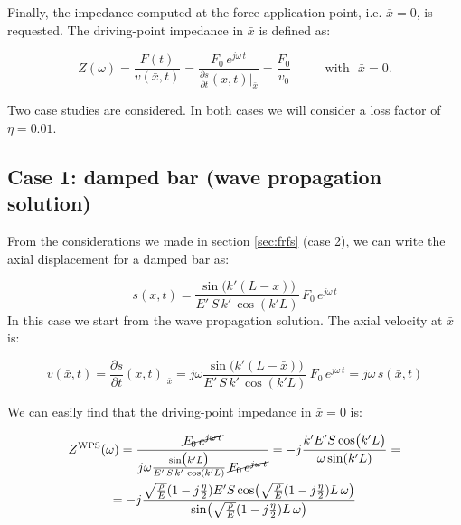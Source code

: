 \documentclass[a4paper,12pt,oneside]{article}
\begin{document}
\vspace{10pt}

Finally, the impedance computed at the force application point, i.e. $ \bar{x} = 0 $, is requested. The driving-point impedance in $\bar{x}$ is defined as:

\[
	Z(\omega) =
		\frac{F(t)}{v(\bar{x},t)} =
		\frac{F_0 \, e^{j \omega \, t}}
		{\frac{\partial s}{\partial t} (x,t)\big|_{\bar{x}}} = \frac{F_0}{v_0}
		\qquad \text{~ with ~} \bar{x} = 0.
\]

Two case studies are considered. In both cases we will consider a loss factor of $ \eta = 0.01 $.

\vspace{20pt}

\subsection*{Case 1: damped bar (wave propagation solution)}

\vspace{10pt}

From the considerations we made in section \ref{sec:frfs} (case 2), we can write the axial displacement for a damped bar as:

\[
	s(x,t) = \frac{\sin\bigl(k'(L - x)\bigr)}{E' \, S \, k' \, \cos(k'L)} \,
		F_0 \, e^{j \omega \, t}
\]
In this case we start from the wave propagation solution. The axial velocity at $ \bar{x} $ is:

\[
	v(\bar{x},t) = \frac{\partial s}{\partial t}(x,t)\big|_{\bar{x}} =
		j \omega \frac{\sin\bigl(k'(L - \bar{x})\bigr)}{E' \, S \, k' \, \cos(k'L)} \,
		F_0 \, e^{j \omega \, t} = j \omega \, s(\bar{x},t)
\]

\clearpage

We can easily find that the driving-point impedance in $ \bar{x} = 0 $ is:


\begin{gather*}
	Z^\textup{WPS} (\omega ) =	\frac{\cancel{F_0 \, e^{j \omega \, t}}}
		{j \omega \frac{\sin\bigl(k'L\bigr)}{E' \, S \, k' \, \cos(k'L)} \,
			\cancel{F_0 \, e^{j \omega \, t}}} =
			-j \frac{k' E' S \cos\bigl(k'L\bigr)}{\omega \sin(k'L)} = \\
	= -j \frac{\sqrt{\frac{\rho}{E}} (1 - j \frac{\eta}{2}) E' S
		\cos\bigl(\sqrt{\frac{\rho}{E}} (1 - j \frac{\eta}{2}) L \, \omega\bigr)}
		{\sin\bigl(\sqrt{\frac{\rho}{E}} (1 - j \frac{\eta}{2}) L \, \omega \bigr)}
\end{gather*} 
\end{document}
